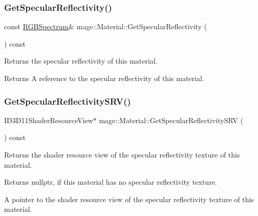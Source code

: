 \subsubsection{\texorpdfstring{Get\+Specular\+Reflectivity()}{GetSpecularReflectivity()}\hspace{0.1cm}{\footnotesize\ttfamily [2/2]}}
{\footnotesize\ttfamily const \hyperlink{structmage_1_1_r_g_b_spectrum}{R\+G\+B\+Spectrum}\& mage\+::\+Material\+::\+Get\+Specular\+Reflectivity (\begin{DoxyParamCaption}{ }\end{DoxyParamCaption}) const\hspace{0.3cm}{\ttfamily [noexcept]}}

Returns the specular reflectivity of this material.

\begin{DoxyReturn}{Returns}
A reference to the specular reflectivity of this material. 
\end{DoxyReturn}
\hypertarget{structmage_1_1_material_a04fad2f985ed5078a8217ebcfd51c3f0}{}\label{structmage_1_1_material_a04fad2f985ed5078a8217ebcfd51c3f0} 
\subsubsection{\texorpdfstring{Get\+Specular\+Reflectivity\+S\+R\+V()}{GetSpecularReflectivitySRV()}}
{\footnotesize\ttfamily I\+D3\+D11\+Shader\+Resource\+View$\ast$ mage\+::\+Material\+::\+Get\+Specular\+Reflectivity\+S\+RV (\begin{DoxyParamCaption}{ }\end{DoxyParamCaption}) const\hspace{0.3cm}{\ttfamily [noexcept]}}

Returns the shader resource view of the specular reflectivity texture of this material.

\begin{DoxyReturn}{Returns}
{\ttfamily nullptr}, if this material has no specular reflectivity texture. 

A pointer to the shader resource view of the specular reflectivity texture of this material. 
\end{DoxyReturn}
\hypertarget{structmage_1_1_material_a7ed5469af2440a4fc1db498c24f06764}{}\label{structmage_1_1_material_a7ed5469af2440a4fc1db498c24f06764} 

